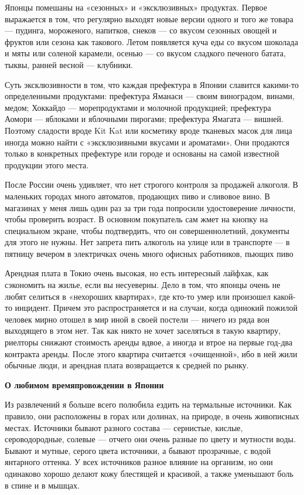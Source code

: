 Японцы помешаны на «сезонных» и «эксклюзивных» продуктах. Первое выражается в том, что регулярно выходят новые версии одного и того же товара — пудинга, мороженого, напитков, снеков — со вкусом сезонных овощей и фруктов или сезона как такового. Летом появляется куча еды со вкусом шоколада и мяты или соленой карамели, осенью — со вкусом сладкого печеного батата, тыквы, ранней весной — клубники.

Суть эксклюзивности в том, что каждая префектура в Японии славится какими-то определенными продуктами: префектура Яманаси — своим виноградом, винами, медом; Хоккайдо — морепродуктами и молочной продукцией; префектура Аомори — яблоками и яблочными пирогами; префектура Ямагата — вишней. Поэтому сладости вроде Kit Kat или косметику вроде тканевых масок для лица иногда можно найти с «эксклюзивными вкусами и ароматами». Они продаются только в конкретных префектуре или городе и основаны на самой известной продукции этого места.

\begin{fancyquotes}
    После России очень удивляет, что нет строгого контроля за продажей алкоголя. В маленьких городах много автоматов, продающих пиво и сливовое вино. В магазинах у меня лишь один раз за три года попросили удостоверение личности, чтобы проверить возраст. В основном покупатель сам жмет на кнопку на специальном экране, чтобы подтвердить, что он совершеннолетний, документы для этого не нужны. Нет запрета пить алкоголь на улице или в транспорте — в пятницу вечером в электричках очень много офисных работников, пьющих пиво
\end{fancyquotes}

Арендная плата в Токио очень высокая, но есть интересный лайфхак, как сэкономить на жилье, если вы несуеверны. Дело в том, что японцы очень не любят селиться в «нехороших квартирах», где кто-то умер или произошел какой-то инцидент. Причем это распространяется и на случаи, когда одинокий пожилой человек мирно отошел в мир иной в своей постели — ничего из ряда вон выходящего в этом нет. Так как никто не хочет заселяться в такую квартиру, риелторы снижают стоимость аренды вдвое, а иногда и втрое на первые год-два контракта аренды. После этого квартира считается «очищенной», ибо в ней жили обычные люди, и арендная плата возвращается к средней по рынку.

\textbf{О любимом времяпровождении в Японии}

Из развлечений я больше всего полюбила ездить на термальные источники. Как правило, они расположены в горах или долинах, на природе, в очень живописных местах. Источники бывают разного состава — сернистые, кислые, сероводородные, солевые — отчего они очень разные по цвету и мутности воды. Бывают и мутные, серого цвета источники, а бывают прозрачные, с водой янтарного оттенка. У всех источников разное влияние на организм, но они одинаково хорошо делают кожу блестящей и красивой, а также уменьшают боль в спине и в мышцах.




